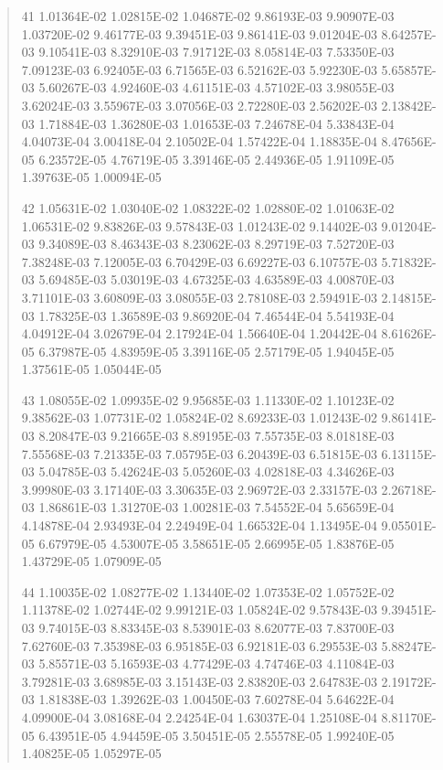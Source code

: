 \documentclass[letterpaper,10pt,english]{sphinxmanual}
\begin{document}
\begin{quote}
\begin{DUlineblock}{0em}
\item[] 41   1.01364E-02  1.02815E-02  1.04687E-02  9.86193E-03  9.90907E-03  1.03720E-02  9.46177E-03  9.39451E-03  9.86141E-03  9.01204E-03  8.64257E-03  9.10541E-03  8.32910E-03  7.91712E-03  8.05814E-03  7.53350E-03  7.09123E-03  6.92405E-03  6.71565E-03  6.52162E-03  5.92230E-03  5.65857E-03  5.60267E-03  4.92460E-03  4.61151E-03  4.57102E-03  3.98055E-03  3.62024E-03  3.55967E-03  3.07056E-03  2.72280E-03  2.56202E-03  2.13842E-03  1.71884E-03  1.36280E-03  1.01653E-03  7.24678E-04  5.33843E-04  4.04073E-04  3.00418E-04  2.10502E-04  1.57422E-04  1.18835E-04  8.47656E-05  6.23572E-05  4.76719E-05  3.39146E-05  2.44936E-05  1.91109E-05  1.39763E-05  1.00094E-05
\item[] 42   1.05631E-02  1.03040E-02  1.08322E-02  1.02880E-02  1.01063E-02  1.06531E-02  9.83826E-03  9.57843E-03  1.01243E-02  9.14402E-03  9.01204E-03  9.34089E-03  8.46343E-03  8.23062E-03  8.29719E-03  7.52720E-03  7.38248E-03  7.12005E-03  6.70429E-03  6.69227E-03  6.10757E-03  5.71832E-03  5.69485E-03  5.03019E-03  4.67325E-03  4.63589E-03  4.00870E-03  3.71101E-03  3.60809E-03  3.08055E-03  2.78108E-03  2.59491E-03  2.14815E-03  1.78325E-03  1.36589E-03  9.86920E-04  7.46544E-04  5.54193E-04  4.04912E-04  3.02679E-04  2.17924E-04  1.56640E-04  1.20442E-04  8.61626E-05  6.37987E-05  4.83959E-05  3.39116E-05  2.57179E-05  1.94045E-05  1.37561E-05  1.05044E-05
\item[] 43   1.08055E-02  1.09935E-02  9.95685E-03  1.11330E-02  1.10123E-02  9.38562E-03  1.07731E-02  1.05824E-02  8.69233E-03  1.01243E-02  9.86141E-03  8.20847E-03  9.21665E-03  8.89195E-03  7.55735E-03  8.01818E-03  7.55568E-03  7.21335E-03  7.05795E-03  6.20439E-03  6.51815E-03  6.13115E-03  5.04785E-03  5.42624E-03  5.05260E-03  4.02818E-03  4.34626E-03  3.99980E-03  3.17140E-03  3.30635E-03  2.96972E-03  2.33157E-03  2.26718E-03  1.86861E-03  1.31270E-03  1.00281E-03  7.54552E-04  5.65659E-04  4.14878E-04  2.93493E-04  2.24949E-04  1.66532E-04  1.13495E-04  9.05501E-05  6.67979E-05  4.53007E-05  3.58651E-05  2.66995E-05  1.83876E-05  1.43729E-05  1.07909E-05
\item[] 44   1.10035E-02  1.08277E-02  1.13440E-02  1.07353E-02  1.05752E-02  1.11378E-02  1.02744E-02  9.99121E-03  1.05824E-02  9.57843E-03  9.39451E-03  9.74015E-03  8.83345E-03  8.53901E-03  8.62077E-03  7.83700E-03  7.62760E-03  7.35398E-03  6.95185E-03  6.92181E-03  6.29553E-03  5.88247E-03  5.85571E-03  5.16593E-03  4.77429E-03  4.74746E-03  4.11084E-03  3.79281E-03  3.68985E-03  3.15143E-03  2.83820E-03  2.64783E-03  2.19172E-03  1.81838E-03  1.39262E-03  1.00450E-03  7.60278E-04  5.64622E-04  4.09900E-04  3.08168E-04  2.24254E-04  1.63037E-04  1.25108E-04  8.81170E-05  6.43951E-05  4.94459E-05  3.50451E-05  2.55578E-05  1.99240E-05  1.40825E-05  1.05297E-05

\end{DUlineblock}
\end{quote}
\end{document}
